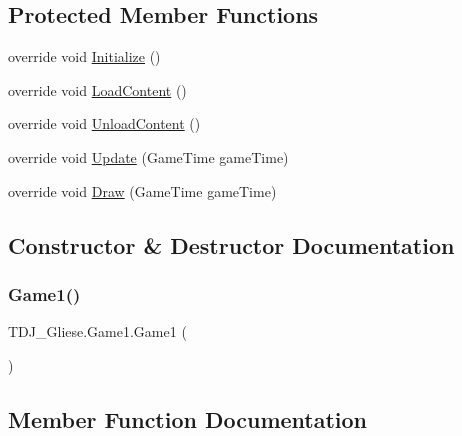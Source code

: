 \subsection*{Protected Member Functions}
\begin{DoxyCompactItemize}
\item 
override void \hyperlink{class_t_d_j___gliese_1_1_game1_a1960a76d684152d1c60e4f96367701b0}{Initialize} ()
\item 
override void \hyperlink{class_t_d_j___gliese_1_1_game1_ae5cd743cb883778cbf3f0a626e47ef94}{Load\+Content} ()
\item 
override void \hyperlink{class_t_d_j___gliese_1_1_game1_ac3e77e4da26ae3e5a85d4ddca7492819}{Unload\+Content} ()
\item 
override void \hyperlink{class_t_d_j___gliese_1_1_game1_a871390046e9a7a4f8346098eaab3c5b6}{Update} (Game\+Time game\+Time)
\item 
override void \hyperlink{class_t_d_j___gliese_1_1_game1_a5245411dae6b531d02617675fd5d1a8b}{Draw} (Game\+Time game\+Time)
\end{DoxyCompactItemize}


\subsection{Constructor \& Destructor Documentation}
\mbox{\label{class_t_d_j___gliese_1_1_game1_a4ab3d1367aa2bfebb3e81b1d05925cf8}} 
\subsubsection{\texorpdfstring{Game1()}{Game1()}}
{\footnotesize\ttfamily T\+D\+J\+\_\+\+Gliese.\+Game1.\+Game1 (\begin{DoxyParamCaption}{ }\end{DoxyParamCaption})}



\subsection{Member Function Documentation}
\mbox{\label{class_t_d_j___gliese_1_1_game1_a5245411dae6b531d02617675fd5d1a8b}} 
